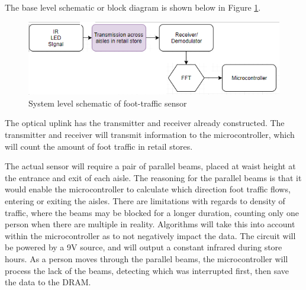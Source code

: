 



The base level schematic or block diagram is shown below in Figure \ref{fig:blockproposal}.
\begin{figure}
	\centering
	\includegraphics[width=0.7\linewidth]{Proposed_work/blockproposal}
	\caption{System level schematic of foot-traffic sensor}
	\label{fig:blockproposal}
\end{figure}

The optical uplink has the transmitter and receiver already constructed. The transmitter and receiver will transmit information to the microcontroller, which will count the amount of foot traffic in retail stores. 

The actual sensor will require a pair of parallel beams, placed at waist height at the entrance and exit of each aisle. The reasoning for the parallel beams is that it would enable the microcontroller to calculate which direction foot traffic flows, entering or exiting the aisles. There are limitations with regards to density of traffic, where the beams may be blocked for a longer duration, counting only one person when there are multiple in reality. Algorithms will take this into account within the microcontroller as to not negatively impact the data. The circuit will be powered by a 9V source, and will output a constant infrared during store hours. As a person moves through the parallel beams, the microcontroller will process the lack of the beams, detecting which was interrupted first, then save the data to the DRAM. 



